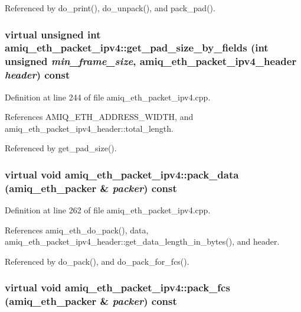 Referenced by do\_\-print(), do\_\-unpack(), and pack\_\-pad().\hypertarget{classamiq__eth__packet__ipv4_af92a061a75e5ab1a6406f3dae1000b45}{
\subsubsection[{get\_\-pad\_\-size\_\-by\_\-fields}]{\setlength{\rightskip}{0pt plus 5cm}virtual unsigned int amiq\_\-eth\_\-packet\_\-ipv4::get\_\-pad\_\-size\_\-by\_\-fields (int unsigned {\em min\_\-frame\_\-size}, \/  {\bf amiq\_\-eth\_\-packet\_\-ipv4\_\-header} {\em header}) const}}
\label{classamiq__eth__packet__ipv4_af92a061a75e5ab1a6406f3dae1000b45}


Definition at line 244 of file amiq\_\-eth\_\-packet\_\-ipv4.cpp.

References AMIQ\_\-ETH\_\-ADDRESS\_\-WIDTH, and amiq\_\-eth\_\-packet\_\-ipv4\_\-header::total\_\-length.

Referenced by get\_\-pad\_\-size().\hypertarget{classamiq__eth__packet__ipv4_ab9ba03ff0d5aafd804c64001871a7a75}{
\subsubsection[{pack\_\-data}]{\setlength{\rightskip}{0pt plus 5cm}virtual void amiq\_\-eth\_\-packet\_\-ipv4::pack\_\-data ({\bf amiq\_\-eth\_\-packer} \& {\em packer}) const}}
\label{classamiq__eth__packet__ipv4_ab9ba03ff0d5aafd804c64001871a7a75}


Definition at line 262 of file amiq\_\-eth\_\-packet\_\-ipv4.cpp.

References amiq\_\-eth\_\-do\_\-pack(), data, amiq\_\-eth\_\-packet\_\-ipv4\_\-header::get\_\-data\_\-length\_\-in\_\-bytes(), and header.

Referenced by do\_\-pack(), and do\_\-pack\_\-for\_\-fcs().\hypertarget{classamiq__eth__packet__ipv4_abc9d3857d1f9355c5057cb4d2825e7ea}{
\subsubsection[{pack\_\-fcs}]{\setlength{\rightskip}{0pt plus 5cm}virtual void amiq\_\-eth\_\-packet\_\-ipv4::pack\_\-fcs ({\bf amiq\_\-eth\_\-packer} \& {\em packer}) const}}
\label{classamiq__eth__packet__ipv4_abc9d3857d1f9355c5057cb4d2825e7ea}


